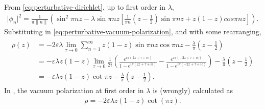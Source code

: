 From \eqref{eq:perturbative-dirichlet}, up to first order in $\lambda$,
\begin{align}
	\lvert \phi_n\rvert ^2 = \frac{1}{\pi\|n\|} \left( \sin^2\pi n z - \lambda \sin\pi n z \left[ \frac{1}{\pi n } \left( z - \frac{1}{2} \right) \sin \pi n z + z (1- z) cos \pi n z\right]  \right) .
\end{align}
Substituting in \eqref{eq:perturbative-vacuum-polarization}, and with some rearranging, 
\begin{align}
	\begin{split}
		\rho(z) &= -2\varepsilon \lambda \lim_{\tau \to 0} \sum_{n=1}^{\infty} z(1-z) \sin \pi n z  \cos \pi nz - \frac{\lambda}{\pi} \left( z-\frac{1}{2} \right) \\
		&= -\varepsilon \lambda  z(1-z) \lim_{\tau \to 0} \frac{1}{2i} 
		\left(
			\frac{e^{i \pi (2 z + \tau + i\epsilon)}}{1 - e^{i\pi( 2z + \tau + i\epsilon) }} 
			- \frac{e^{i \pi (-2 z + \tau + i\epsilon)}}{1 - e^{i\pi( -2z + \tau + i\epsilon) }} 
		\right) 
		- \frac{\lambda}{\pi} \left( z-\frac{1}{2} \right) \\
		&= -\varepsilon \lambda  z(1-z) \cot \pi z	- \frac{\lambda}{\pi} \left( z-\frac{1}{2} \right).
	\end{split}
\end{align}
In \cite{Ambjorn1983}, the vacuum polarization at first order in $\lambda$ is (wrongly) calculated as 
\begin{align}
	\rho  =  - 2 \varepsilon\lambda z (1-z) \cot(\pi z).
\end{align}


